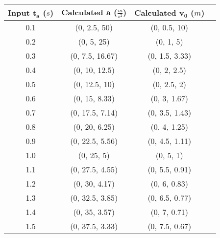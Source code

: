 \begin{tabular}{| c | c | c | c |}
	\hline
	Input $\mathbf{t_a}$ ($s$) & Calculated $\mathbf{a}$ ($\frac{m}{s^2}$) & Calculated $\mathbf{v_{0}}$ ($m$) \\ \hline
	0.1 & (0, 2.5,  50)    & (0, 0.5, 10)   \\ \hline
	0.2 & (0, 5,    25)    & (0, 1,   5)    \\ \hline
	0.3 & (0, 7.5,  16.67) & (0, 1.5, 3.33) \\ \hline
	0.4 & (0, 10,   12.5)  & (0, 2,   2.5)  \\ \hline
	0.5 & (0, 12.5, 10)    & (0, 2.5, 2)    \\ \hline
	0.6 & (0, 15,   8.33)  & (0, 3,   1.67) \\ \hline
	0.7 & (0, 17.5, 7.14)  & (0, 3.5, 1.43) \\ \hline
	0.8 & (0, 20,   6.25)  & (0, 4,   1.25) \\ \hline
	0.9 & (0, 22.5, 5.56)  & (0, 4.5, 1.11) \\ \hline
	1.0 & (0, 25,   5)     & (0, 5,   1)    \\ \hline
	1.1 & (0, 27.5, 4.55)  & (0, 5.5, 0.91) \\ \hline
	1.2 & (0, 30,   4.17)  & (0, 6,   0.83) \\ \hline
	1.3 & (0, 32.5, 3.85)  & (0, 6.5, 0.77) \\ \hline
	1.4 & (0, 35,   3.57)  & (0, 7,   0.71) \\ \hline
	1.5 & (0, 37.5, 3.33)  & (0, 7.5, 0.67) \\ \hline
\end{tabular}